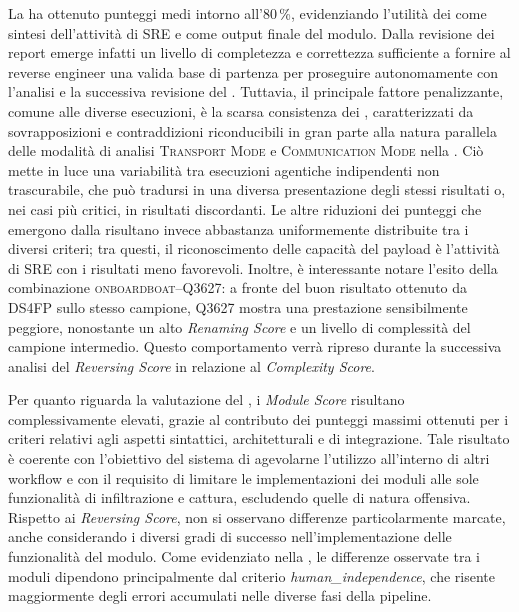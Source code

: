 La \reversing{} ha ottenuto punteggi medi intorno all'80\,\%, evidenziando l'utilità dei \report{} come sintesi dell'attività di SRE e come output finale del modulo. Dalla revisione dei report emerge infatti un livello di completezza e correttezza sufficiente a fornire al reverse engineer una valida base di partenza per proseguire autonomamente con l'analisi e la successiva revisione del \capture{}. Tuttavia, il principale fattore penalizzante, comune alle diverse esecuzioni, è la scarsa consistenza dei \report{}, caratterizzati da sovrapposizioni e contraddizioni riconducibili in gran parte alla natura parallela delle modalità di analisi \textsc{Transport Mode} e \textsc{Communication Mode} nella \reversing{}. Ciò mette in luce una variabilità tra esecuzioni agentiche indipendenti non trascurabile, che può tradursi in una diversa presentazione degli stessi risultati o, nei casi più critici, in risultati discordanti. Le altre riduzioni dei punteggi che emergono dalla  risultano invece abbastanza uniformemente distribuite tra i diversi criteri; tra questi, il riconoscimento delle capacità del payload è l'attività di SRE con i risultati meno favorevoli. Inoltre, è interessante notare l'esito della combinazione \textsc{onboardboat}--Q3627: a fronte del buon risultato ottenuto da DS4FP sullo stesso campione, Q3627 mostra una prestazione sensibilmente peggiore, nonostante un alto \emph{Renaming Score} e un livello di complessità del campione intermedio. Questo comportamento verrà ripreso durante la successiva analisi del \emph{Reversing Score} in relazione al \emph{Complexity Score}.


Per quanto riguarda la valutazione del \capture{}, i \emph{Module Score} risultano complessivamente elevati, grazie al contributo dei punteggi massimi ottenuti per i criteri relativi agli aspetti sintattici, architetturali e di integrazione. Tale risultato è coerente con l'obiettivo del sistema di agevolarne l'utilizzo all'interno di altri workflow e con il requisito di limitare le implementazioni dei moduli alle sole funzionalità di infiltrazione e cattura, escludendo quelle di natura offensiva. Rispetto ai \emph{Reversing Score}, non si osservano differenze particolarmente marcate, anche considerando i diversi gradi di successo nell'implementazione delle funzionalità del modulo. Come evidenziato nella , le differenze osservate tra i moduli dipendono principalmente dal criterio \emph{human\_independence}, che risente maggiormente degli errori accumulati nelle diverse fasi della pipeline.

